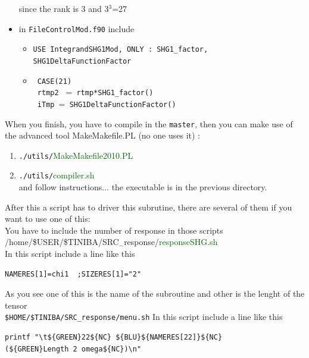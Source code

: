 \documentclass[12pt,leqno]{article}
\numberwithin{equation}{section}
\begin{document}
\begin{itemize}
since the rank is 3 and 3$^3$=27

\item in \verb=FileControlMod.f90= include

\begin{itemize}
\item \verb=USE IntegrandSHG1Mod, ONLY : SHG1_factor, SHG1DeltaFunctionFactor=
\item
\verb= CASE(21)=\\
\verb= rtmp2 = =\verb= rtmp*SHG1_factor()=\\
\verb= iTmp ==\verb= SHG1DeltaFunctionFactor()=

\end{itemize}


\end{itemize}        
When you finish, you have to compile in the \verb=master=, then you can make use of the 
advanced tool MakeMakefile.PL (no one uses it) :
\begin{enumerate}
\item \verb=./utils/=\textcolor{darkgreen}{MakeMakefile2010.PL}
\item
  \verb=./utils/=\textcolor{darkgreen}{compiler.sh}\\
and follow instructions$\ldots$ the executable is in the previous directory.
\end{enumerate}



After this a script has to driver this subrutine, there are several of them 
if you want to use one of this:\\
You have to include the number of response in those scripts\\
/home/\$USER/\$TINIBA/SRC$_{-}$response/\textcolor{darkgreen}{responseSHG.sh}\\
In this script include a line like this
\begin{verbatim}
NAMERES[1]=chi1  ;SIZERES[1]="2"
\end{verbatim}
As you see one of this is the name of the subroutine and other is the lenght of the tensor\\ 
\verb=$HOME/$TINIBA/SRC_response/menu.sh=
In this script include a line like this
\begin{verbatim}
printf "\t${GREEN}22${NC} ${BLU}${NAMERES[22]}${NC}  
(${GREEN}Length 2 omega${NC})\n"
\end{verbatim}
\end{document}
